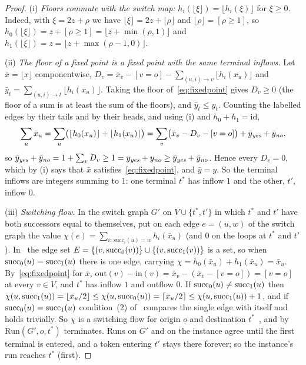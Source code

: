 \begin{proof}
\relax[$\Delta2$] (i) \emph{Floors commute with the switch map:} $h_i(\lfloor\xi\rfloor)=\lfloor
h_i(\xi)\rfloor$ for $\xi\ge0$. Indeed, with $\xi=2z+\rho$ we have $\lfloor\xi\rfloor=2z+\lfloor\rho\rfloor$
and $\lfloor\rho\rfloor=[\rho\ge1]$, so $h_0(\lfloor\xi\rfloor)=z+[\rho\ge1]=\lfloor z+\min(\rho,1)\rfloor$
and $h_1(\lfloor\xi\rfloor)=z=\lfloor z+\max(\rho-1,0)\rfloor$.

(ii) \emph{The floor of a fixed point is a fixed point with the same terminal inflows.} Let
$\bar x=\lfloor x\rfloor$ componentwise, $D_v=\bar x_v-[v=o]-\sum_{(u,i)\to v}\lfloor h_i(x_u)\rfloor$ and
$\bar y_t=\sum_{(u,i)\to t}\lfloor h_i(x_u)\rfloor$. Taking the floor of~\eqref{eq:fixedpoint} gives
$D_v\ge0$ (the floor of a sum is at least the sum of the floors), and $\bar y_t\le y_t$. Counting the
labelled edges by their tails and by their heads, and using (i) and $h_0+h_1=\mathrm{id}$,
\[
\sum_u\bar x_u=\sum_u\bigl(\lfloor h_0(x_u)\rfloor+\lfloor h_1(x_u)\rfloor\bigr)
=\sum_v\bigl(\bar x_v-D_v-[v=o]\bigr)+\bar y_{\textit{yes}}+\bar y_{\textit{no}},
\]
so $\bar y_{\textit{yes}}+\bar y_{\textit{no}}=1+\sum_vD_v\ge1=y_{\textit{yes}}+y_{\textit{no}}\ge\bar y_{\textit{yes}}+\bar y_{\textit{no}}$. Hence every
$D_v=0$, which by (i) says that $\bar x$ satisfies~\eqref{eq:fixedpoint}, and $\bar y=y$. So the terminal
inflows are integers summing to $1$: one terminal $t^*$ has inflow $1$ and the other, $t'$, inflow $0$.

(iii) \emph{Switching flow.} In the switch graph $G'$ on $V\cup\{t^*,t'\}$ in which $t^*$ and $t'$ have
both successors equal to themselves, put on each edge $e=(u,w)$ of the switch graph the value
$\chi(e)=\sum_{i:\,\mathrm{succ}_i(u)=w}h_i(\bar x_u)$ (and $0$ on the loops at $t^*$ and $t'$).
In~\cite{dgkmw17} the edge set $E=\{(v,\mathrm{succ}_0(v))\}\cup\{(v,\mathrm{succ}_1(v))\}$ is a set, so when
$\mathrm{succ}_0(u)=\mathrm{succ}_1(u)$ there is one edge, carrying $\chi=h_0(\bar x_u)+h_1(\bar x_u)=\bar x_u$.
By~\eqref{eq:fixedpoint} for $\bar x$, $\mathrm{out}(v)-\mathrm{in}(v)=\bar x_v-(\bar x_v-[v=o])=[v=o]$
at every $v\in V$, and $t^*$ has inflow $1$ and outflow $0$. If $\mathrm{succ}_0(u)\ne\mathrm{succ}_1(u)$ then
$\chi(u,\mathrm{succ}_1(u))=\lfloor\bar x_u/2\rfloor\le\chi(u,\mathrm{succ}_0(u))=\lceil\bar x_u/2\rceil\le
\chi(u,\mathrm{succ}_1(u))+1$, and if $\mathrm{succ}_0(u)=\mathrm{succ}_1(u)$ condition~(2) of~\cite[Def.~2]{dgkmw17} compares the
single edge with itself and holds trivially. So $\chi$ is a switching flow for origin $o$ and
destination $t^*$~\cite[Def.~2]{dgkmw17}, and by~\cite[Lemma~1]{dgkmw17} $\mathrm{Run}(G',o,t^*)$
terminates. Runs on $G'$ and on the instance agree until the first terminal is entered, and a token
entering $t'$ stays there forever; so the instance's run reaches $t^*$ (first).
\end{proof}

